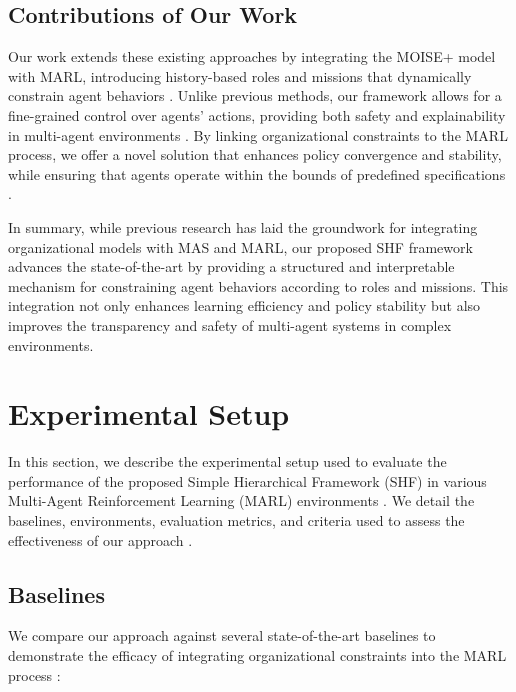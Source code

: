 \documentclass[sigconf,anonymous]{aamas}
\begin{document}
\subsection{Contributions of Our Work}
Our work extends these existing approaches by integrating the MOISE+ model with MARL, introducing history-based roles and missions that dynamically constrain agent behaviors \cite{hubner2010moise}. Unlike previous methods, our framework allows for a fine-grained control over agents' actions, providing both safety and explainability in multi-agent environments \cite{ghosal2021explainable}. By linking organizational constraints to the MARL process, we offer a novel solution that enhances policy convergence and stability, while ensuring that agents operate within the bounds of predefined specifications \cite{hubner2010moise, soule2024}.

In summary, while previous research has laid the groundwork for integrating organizational models with MAS and MARL, our proposed SHF framework advances the state-of-the-art by providing a structured and interpretable mechanism for constraining agent behaviors according to roles and missions. This integration not only enhances learning efficiency and policy stability but also improves the transparency and safety of multi-agent systems in complex environments.


\section{Experimental Setup}
\label{sec:experimental_setup}

In this section, we describe the experimental setup used to evaluate the performance of the proposed Simple Hierarchical Framework (SHF) in various Multi-Agent Reinforcement Learning (MARL) environments \cite{hubner2010moise}. We detail the baselines, environments, evaluation metrics, and criteria used to assess the effectiveness of our approach \cite{foerster2018counterfactual, soule2024}.


\subsection{Baselines}
We compare our approach against several state-of-the-art baselines to demonstrate the efficacy of integrating organizational constraints into the MARL process \cite{foerster2018counterfactual}:
\end{document}
